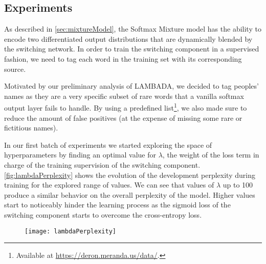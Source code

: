 \subsection{Experiments}
\label{sec:smmExps}

As described in \autoref{sec:mixtureModel}, the Softmax Mixture model has the ability to encode two differentiated output distributions that are dynamically blended by the switching network. In order to train the switching component in a supervised fashion, we need to tag each word in the training set with its corresponding source. 

Motivated by our preliminary analysis of LAMBADA, we decided to tag peoples' names as they are a very specific subset of rare words that a vanilla softmax output layer fails to handle. By using a predefined list\footnote{Available at \url{https://deron.meranda.us/data/}.}, we also made sure to reduce the amount of false positives (at the expense of missing some rare or fictitious names).

In our first batch of experiments we started exploring the space of hyperparameters by finding an optimal value for $\lambda$, the weight of the loss term in charge of the training supervision of the switching component. \autoref{fig:lambdaPerplexity} shows the evolution of the development perplexity during training for the explored range of values. We can see that values of $\lambda$ up to 100 produce a similar behavior on the overall perplexity of the model. Higher values start to noticeably hinder the learning process as the sigmoid loss of the switching component starts to overcome the cross-entropy loss.

\begin{figure}[H]
	\centering
	\texttt{[image: lambdaPerplexity]}
	\label{fig:lambdaPerplexity}
\end{figure}

